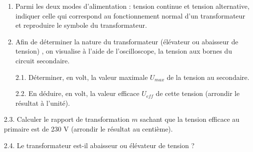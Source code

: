 \documentclass[11pt,a4paper]{article}
\newcommand{\cadreblanc}[1]{%
\medskip\framebox[\linewidth][c]{%
\rule{0mm}{#1mm}}\par
\medskip}
\begin{document}
\begin{enumerate}
    \item Parmi les deux modes d'alimentation : tension continue et tension alternative, indiquer celle qui correspond au fonctionnement normal d'un transformateur et reproduire le symbole du transformateur. 

    \vspace{2mm}

    \cadreblanc{10}


\item Afin de déterminer la nature du transformateur (élévateur ou abaisseur de tension) , on visualise à l'aide de l'oscilloscope, la tension aux bornes du circuit secondaire. 


\noindent%
\begin{minipage}{.55\textwidth}%

    2.1. Déterminer, en volt, la valeur maximale $U_{max}$ de la tension au secondaire. 

    \cadreblanc{10}

    2.2. En déduire, en volt, la valeur efficace $U_{eff}$ de cette tension (arrondir le résultat à l'unité). 

    \cadreblanc{15}
\end{minipage}%
\hfill
\begin{minipage}{.35\textwidth}%
\centering
\osci[%
scale=0.5,
second channel=0,
screen offset one=0,
screen offset two=0,
time div=5,
voltage div one=10,
voltage div two=2,
sample rate=200,
xy mode=0,
func one=25*sin(2*180/0.020*x),
func two=3*sin(2*180/0.020*x+180),
color one=D62626,
color two=1053AF,
graph back color=FFFFFF,
info back color=D6D6D6,
info text color=000000,
main axis color=000000,
grid color=CCCCCC
]

\end{minipage}%

\end{enumerate}

\newpage 

2.3. Calculer le rapport de transformation $m$ sachant que la tension efficace au primaire est de 230 V (arrondir le résultat au centième). 

\cadreblanc{15}

2.4. Le transformateur est-il abaisseur ou élévateur de tension ?
\vspace{5mm}

\dotfill 
\end{document}
